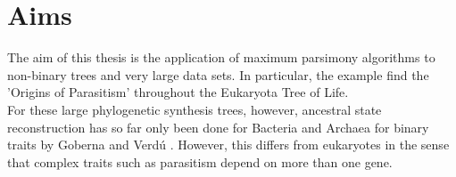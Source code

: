 \chapter{Aims}
  The aim of this thesis is the application of maximum parsimony algorithms to non-binary 
    trees and very large data sets. In particular, the example find the 'Origins of Parasitism' 
    throughout the Eukaryota Tree of Life. \\
  For these large phylogenetic synthesis trees, however, ancestral state reconstruction has so far 
    only been done for Bacteria and Archaea for binary traits by Goberna and Verdú \cite{Goberna2015}.
    However, this differs from eukaryotes in the sense that complex traits such as parasitism depend
    on more than one gene. \\

